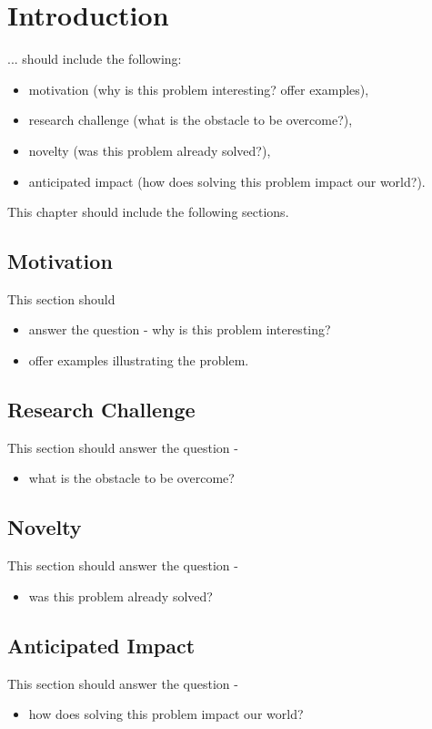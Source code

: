 \chapter{Introduction\label{cha:intro}}

... should include the following:
\begin{itemize}
\item motivation (why is this problem interesting? offer examples),
\item research challenge (what is the obstacle to be overcome?),
\item novelty (was this problem already solved?),
\item anticipated impact (how does solving this problem impact our world?).
\end{itemize}

This chapter should include the following sections.

\section{Motivation\label{sec:moti}}
This section should 
\begin{itemize}
    \item answer the question - why is this problem interesting? 
    \item offer examples illustrating the problem.
\end{itemize}


\section{Research Challenge\label{sec:objective}}
This section should answer the question -
\begin{itemize}
    \item what is the obstacle to be overcome?
\end{itemize}

\section{Novelty \label{sec:scope}}
This section should answer the question -
\begin{itemize}
    \item was this problem already solved?
\end{itemize}

\section{Anticipated Impact \label{sec:outline}}
This section should answer the question -
\begin{itemize}
    \item how does solving this problem impact our world?
\end{itemize}

